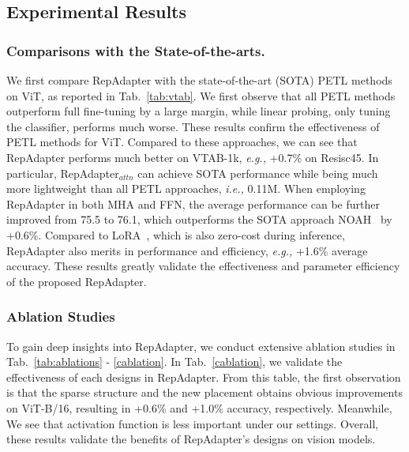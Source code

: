  \subsection{ Experimental Results}
 \subsubsection{Comparisons  with the State-of-the-arts.} We first compare RepAdapter with the state-of-the-art (SOTA)    PETL methods  on ViT, as reported in Tab.~\ref{tab:vtab}.  We first  observe that all PETL methods outperform  full fine-tuning   by a large margin, while  linear probing,      only  tuning the classifier, performs much worse. These results confirm the effectiveness of PETL methods   for ViT.  Compared to these approaches, we can see that RepAdapter performs much better on   VTAB-1k, \emph{e.g.,} +0.7\% on Resisc45.  In particular,  RepAdapter$_{attn}$ can   achieve   SOTA performance while being much more lightweight than all PETL approaches, \emph{i.e.,} 0.11M. When employing RepAdapter  in both MHA and FFN, the average performance can  be  further improved from 75.5 to 76.1, which outperforms  the  SOTA approach NOAH~\cite{noah} by +0.6\%.  Compared to LoRA~\cite{lora}, which is also zero-cost during inference, RepAdapter  also merits in  performance and efficiency, \emph{e.g.,} +1.6\%  average accuracy. These results greatly validate the   effectiveness and  parameter   efficiency of the proposed RepAdapter.

 \subsubsection{Ablation Studies} To gain deep insights  into RepAdapter, we conduct extensive ablation studies in Tab.~\ref{tab:ablations} - \ref{cablation}.  In Tab.~\ref{cablation}, we validate the effectiveness of each designs in RepAdapter. From this table, the first observation is that the  sparse structure and   the new placement  obtains  obvious improvements on ViT-B/16, resulting in   +0.6\% and +1.0\%  accuracy, respectively. Meanwhile, We  see that activation function is less important  under our settings. Overall,  these results validate the benefits of RepAdapter's designs on vision models.

